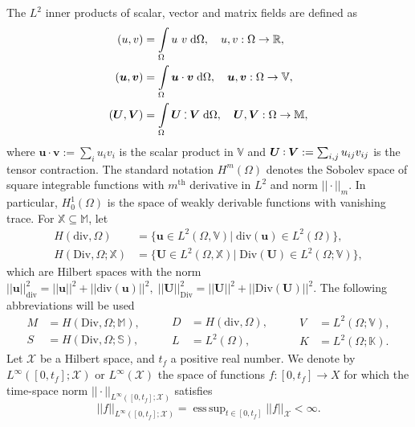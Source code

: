 \documentclass{ifacconf}
\DeclareMathOperator*{\esssup}{ess\,sup}
\def\onedot{$\mathsurround0pt\ldotp$}
\def\cddot{%
	\mathbin{\vcenter{\baselineskip.67ex
			\hbox{\onedot}\hbox{\onedot}}%
}}
\begin{document}
The $L^2$ inner products of scalar, vector and matrix fields are defined as
\begin{align*}
	(u, v) &= \int_{\Omega} u \ v \d\Omega, \quad u, v : \Omega \rightarrow \mathbb{R}, \\
	(\bm{u}, \bm{v}) &= \int_{\Omega} \bm{u} \cdot \bm{v} \d\Omega, \quad \bm{u}, \bm{v} : \Omega \rightarrow \mathbb{V}, \\
	(\bm{U}, \bm{V}) &= \int_{\Omega} \bm{U} \cddot \bm{V} \d\Omega, \quad \bm{U}, \bm{V} : \Omega \rightarrow \mathbb{M},
\end{align*}
where $\bm{u} \cdot \bm{v} := \sum_{i} u_{i} v_{i}$ is the scalar product in $\mathbb{V}$ and $\bm{U} \cddot \bm{V} := \sum_{i,j} u_{ij} v_{ij}$ is the tensor contraction. The standard notation $H^m(\Omega)$ denotes the Sobolev space of square integrable functions with  $m^\text{th}$ derivative in $L^2$ and norm $||\cdot||_m$. In particular, $H^1_0(\Omega)$ is the space of weakly derivable functions with vanishing trace. For $\mathbb{X} \subseteq \mathbb{M}$, let
\begin{equation*}
\begin{aligned}
H(\mathrm{div}, \Omega) &= \{\bm{u} \in L^2(\Omega, \mathbb{V}) \vert \; \mathrm{div}(\bm{u}) \in L^2(\Omega) \}, \\
H(\mathrm{Div}, \Omega; \mathbb{X}) &= \{\bm{U} \in L^2(\Omega, \mathbb{X}) \vert \; \mathrm{Div}(\bm{U}) \in L^2(\Omega; \mathbb{V}) \},
\end{aligned}
\end{equation*}
which are Hilbert spaces with the norm $||\bm{u}||^2_{\text{div}} = ||\bm{u}||^2 + ||\mathrm{div}(\bm{u})||^2, \; ||\bm{U}||^2_{\text{Div}} = ||\bm{U}||^2 + ||\mathrm{Div}(\bm{U})||^2$. The following abbreviations will be used
\begin{equation*}
\begin{aligned}
M &= H(\mathrm{Div}, \Omega; \mathbb{M}), \\
S &= H(\mathrm{Div}, \Omega; \mathbb{S}),
\end{aligned} \qquad
\begin{aligned}
D &= H(\mathrm{div}, \Omega), \\
L &= L^2(\Omega),
\end{aligned} \qquad
\begin{aligned}
V &= L^2(\Omega; \mathbb{V}), \\
K &= L^2(\Omega; \mathbb{K}).
\end{aligned}
\end{equation*}
Let $\mathcal{X}$ be a Hilbert space, and $t_f$ a positive real number. We denote by $L^\infty([0, t_f]; \mathcal{X})$ or $L^\infty(\mathcal{X})$ the space of functions $f: [0, t_f] \rightarrow X$ for which the time-space norm $||\cdot||_{L^\infty([0, t_f]; \mathcal{X})}$ satisfies
\[
||f||_{L^\infty([0, t_f]; \mathcal{X})} = \esssup_{t \in [0,t_f]} ||f||_{\mathcal{X}} < \infty.
\]
\end{document}
